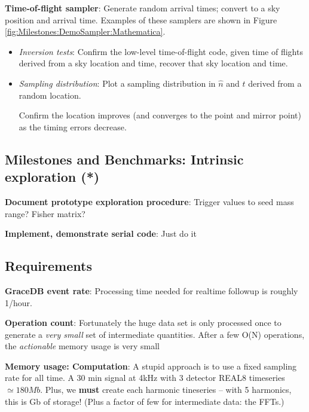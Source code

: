 \documentclass[twocolumn,prd,nofootinbib]{revtex4}
\begin{document}
\begin{widetext}
\noindent \textbf{Time-of-flight sampler}: Generate random arrival times; convert to a sky position and arrival time.
Examples of these samplers are shown in Figure \ref{fig:Milestones:DemoSampler:Mathematica}.
\begin{itemize}
\item \emph{Inversion tests}: Confirm the low-level time-of-flight code, given time of flights derived from a sky
  location and time, recover that sky location and time.
\item \emph{Sampling distribution}: Plot a sampling distribution in $\hat{n}$ and $t$ derived from a random location. 

 Confirm the location improves (and  converges to the point and mirror point) as the timing errors decrease.
\end{itemize}

\subsection{Milestones and Benchmarks:  Intrinsic exploration (*)}

\noindent \textbf{Document prototype exploration procedure}: Trigger values to seed mass range? Fisher matrix?


\noindent \textbf{Implement, demonstrate serial code}: Just do it





\end{widetext}
\subsection{Requirements}

\noindent \textbf{GraceDB event rate}: Processing time needed for realtime followup is roughly 1/hour.

\noindent \textbf{Operation count}: Fortunately the huge data set is only processed once to generate a \emph{very small}
set of intermediate quantities.  After a few O(N) operations, the \emph{actionable} memory usage is very small


\noindent \textbf{Memory usage: Computation}: A stupid approach is to use a fixed sampling rate for all time.
%
A 30 min signal at 4kHz with 3 detector REAL8 timeseries $\simeq 180 Mb$.
Plus, we \textbf{must} create each harmonic tineseries -- with 5 harmonics, this is Gb of storage!  (Plus a factor of few for intermediate
data: the FFTs.)
\end{document}

